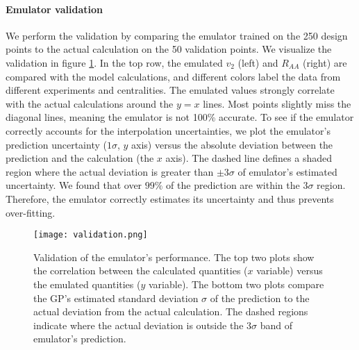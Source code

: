 \paragraph{Emulator validation} 
We perform the validation by comparing the emulator trained on the 250 design points to the actual calculation on the 50 validation points.
We visualize the validation in figure \ref{fig:new:validation}.
In the top row, the emulated $v_2$ (left) and $R_{AA}$ (right) are compared with the model calculations, and different colors label the data from different experiments and centralities.
The emulated values strongly correlate with the actual calculations around the $y=x$ lines.
Most points slightly miss the diagonal lines, meaning the emulator is not 100\% accurate.
To see if the emulator correctly accounts for the interpolation uncertainties, we plot the emulator's prediction uncertainty ($1\sigma$, $y$ axis) versus the absolute deviation between the prediction and the calculation (the $x$ axis).
The dashed line defines a shaded region where the actual deviation is greater than $\pm 3\sigma$ of emulator's estimated uncertainty.
We found that over $99\%$ of the prediction are within the $3\sigma$ region.
Therefore, the emulator correctly estimates its uncertainty and thus prevents over-fitting.

\begin{figure}
\singlespacing
\centering
\texttt{[image: validation.png]}
\caption[Validation of the emulators performance. The top two plots shows]{Validation of the emulator's performance. The top two plots show the correlation between the calculated quantities ($x$ variable) versus the emulated quantities ($y$ variable). The bottom two plots compare the GP's estimated standard deviation $\sigma$ of the prediction to the actual deviation from the actual calculation. The dashed regions indicate where the actual deviation is outside the $3\sigma$ band of emulator's prediction.}
\label{fig:new:validation}
\end{figure}

